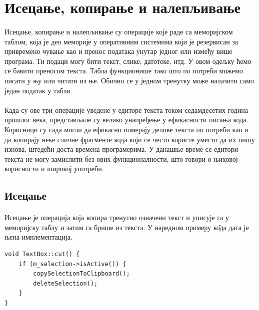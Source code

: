 \documentclass[12pt,oneside]{memoir}
\begin{document}
\section{Исецање, копирање и налепљивање}
\paragraph{}
Исецање, копирање и налепљивање су операције које раде са меморијском таблом, 
која је део меморије у оперативним системима који је резервисан за привремено чување 
као и пренос података унутар једног или између више програма. Ти подаци могу бити текст,
слике, датотеке, итд. У овом одељку ћемо се бавити преносом текста. Табла функционише
тако што по потреби можемо писати у њу или читати из ње. Обично се у једном
тренутку може налазити само један податак у табли.

\paragraph{}
Када су ове три операције уведене у едиторе текста током седамдесетих година 
прошлог века, представљале су велико унапређење у ефикасности писања кода.
Корисници су сада могли да ефикасно померају делове текста по потреби као
и да копирају неке сличне фрагменте кода који се често користе уместо да их
пишу изнова, штедећи доста времена програмерима. У данашње време се едитори текста не
могу замислити без ових функционалности, што говори о њиховој корисности и широкој
употреби.

\subsection{Исецање}
\paragraph{}
Исецање је операција која копира тренутно означени текст и уписује га у 
меморијску таблу и затим га брише из текста. У наредном примеру к\^{о}да дата је њена
имплементација.

\begin{verbatim}
void TextBox::cut() {
	if (m_selection->isActive()) {
		copySelectionToClipboard();
		deleteSelection();
	}
}
\end{verbatim}
\end{document}
